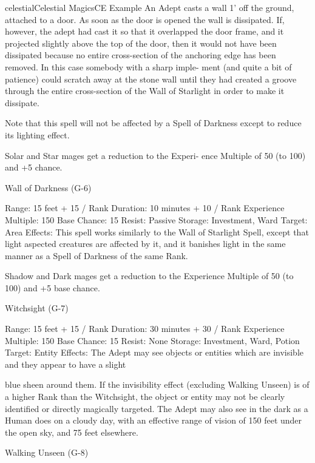\begin{College}[1.3]{celestial}{Celestial Magics}{CE}
Example 
An  Adept  casts  a  wall  1’  off  the  ground, 
attached to a door. As soon as the door is opened the wall 
is  dissipated.  If,  however,  the  adept  had  cast  it  so  that  it 
overlapped the door frame, and it projected slightly above 
the top of the door, then it would not have been dissipated 
because  no  entire  cross-section  of  the  anchoring  edge  has 
been removed. In this case somebody with a sharp imple-
ment  (and  quite  a  bit  of  patience)  could  scratch  away  at 
the stone wall until they had created a groove through the 
entire  cross-section  of  the  Wall  of  Starlight  in  order  to 
make it dissipate. 

Note  that this  spell  will  not  be  affected  by  a  Spell 
of Darkness except to reduce its lighting effect. 

Solar and Star mages get a reduction to the Experi-
ence  Multiple  of  50  (to  100)  and  +5%
chance. 

Wall of Darkness (G-6) 

Range: 15 feet + 15 / Rank 
Duration: 10 minutes + 10 / Rank 
Experience Multiple: 150 
Base Chance: 15%
Resist: Passive 
Storage: Investment, Ward 
Target: Area 
Effects:  This  spell  works  similarly  to  the  Wall  of 
Starlight Spell, except that light aspected creatures 
are affected by it, and it banishes light in the same 
manner as a Spell of Darkness of the same Rank. 

Shadow  and  Dark  mages  get  a  reduction  to  the 
Experience  Multiple  of  50  (to  100)  and  +5%
base chance. 

Witchsight (G-7) 

Range: 15 feet + 15 / Rank 
Duration: 30 minutes + 30 / Rank 
Experience Multiple: 150 
Base Chance: 15%
Resist: None 
Storage: Investment, Ward, Potion 
Target: Entity 
Effects:  The  Adept  may  see  objects  or  entities 
which are invisible and they appear to have a slight 

blue  sheen  around  them.  If  the  invisibility  effect 
(excluding  Walking  Unseen)  is  of  a  higher  Rank 
than the Witchsight, the object or entity may not be 
clearly  identified  or  directly  magically  targeted. 
The  Adept  may  also  see  in  the  dark  as  a  Human 
does  on  a  cloudy  day,  with  an  effective  range  of 
vision of 150 feet under the open sky, and 75 feet 
elsewhere. 

Walking Unseen (G-8) 


\end{College}
